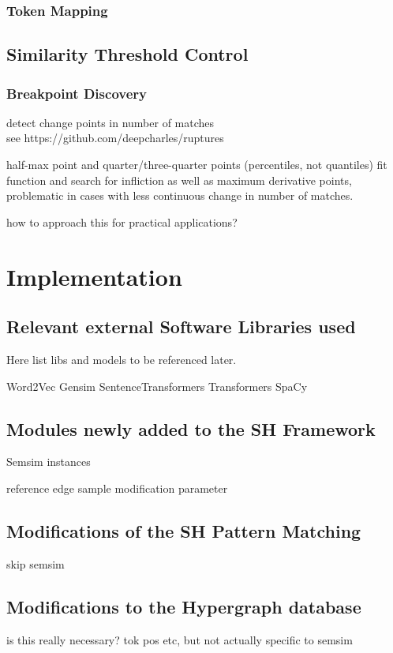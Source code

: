 \documentclass[11pt]{scrreprt}
\begin{document}
\subsection{Token Mapping}



\section{Similarity Threshold Control}

\subsection{Breakpoint Discovery}
detect change points in number of matches \\ 
see https://github.com/deepcharles/ruptures

half-max point and quarter/three-quarter points (percentiles, not quantiles)
fit function and search for infliction as well as maximum derivative points,
problematic in cases with less continuous change in number of matches.

how to approach this for practical applications?


\chapter{Implementation}
\label{cha:implementation}

\section{Relevant external Software Libraries used}
Here list libs and models to be referenced later.

Word2Vec
Gensim
SentenceTransformers
Transformers
SpaCy

\section{Modules newly added to the SH Framework}
Semsim instances

reference edge sample modification parameter


\section{Modifications of the SH Pattern Matching}
skip semsim

\section{Modifications to the Hypergraph database}
is this really necessary? tok pos etc, but not actually specific to semsim
\end{document}
